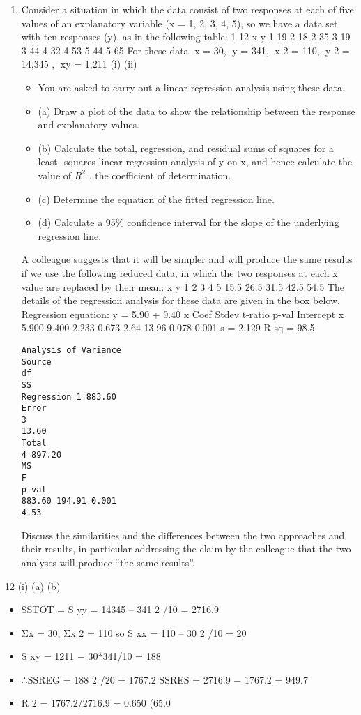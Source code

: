 \documentclass[a4paper,12pt]{article}
\begin{document}
\begin{enumerate}

\item Consider a situation in which the data consist of two responses at each of five values of an explanatory variable (x = 1, 2, 3, 4, 5), so we have a data set with ten responses (y), as in the following table:
1
12
x
y
1
19
2
18
2
35
3
19
3
44
4
32
4
53
5
44
5
65
For these data x = 30, y = 341, x 2 = 110, y 2 = 14,345 , xy = 1,211
(i)
(ii)
\begin{itemize}
\item You are asked to carry out a linear regression analysis using these data.
\item (a) Draw a plot of the data to show the relationship between the response and explanatory values.
\item (b) Calculate the total, regression, and residual sums of squares for a least- squares linear regression analysis of y on x, and hence calculate the value of $R^2$ , the coefficient of determination.
\item (c) Determine the equation of the fitted regression line.
\item (d) Calculate a 95\% confidence interval for the slope of the underlying regression line.
\end{itemize}
A colleague suggests that it will be simpler and will produce the same results if we use the following reduced data, in which the two responses at each x
value are replaced by their mean:
x
y
1
2
3
4
5
15.5 26.5 31.5 42.5 54.5
The details of the regression analysis for these data are given in the box below.
Regression equation: y = 5.90 + 9.40 x
Coef Stdev t-ratio p-val
Intercept
x 5.900
9.400 2.233
0.673 2.64
13.96 0.078
0.001
s = 2.129 R-sq = 98.5%
\begin{verbatim}
Analysis of Variance
Source
df
SS
Regression 1 883.60
Error
3
13.60
Total
4 897.20
MS
F
p-val
883.60 194.91 0.001
4.53
\end{verbatim}
Discuss the similarities and the differences between the two approaches and their
results, in particular addressing the claim by the colleague that the two analyses will
produce “the same results”.

\end{enumerate}
\newpage
12
(i)
(a)
(b)
\begin{itemize}
\item SSTOT = S yy = 14345 – 341 2 /10 = 2716.9
\item Σx = 30, Σx 2 = 110 so S xx = 110 – 30 2 /10 = 20
\item S xy = 1211 − 30*341/10 = 188
\item ∴SSREG = 188 2 /20 = 1767.2
SSRES = 2716.9 − 1767.2 = 949.7
\item R 2 = 1767.2/2716.9 = 0.650 (65.0%
\end{itemize}
\end{document}
